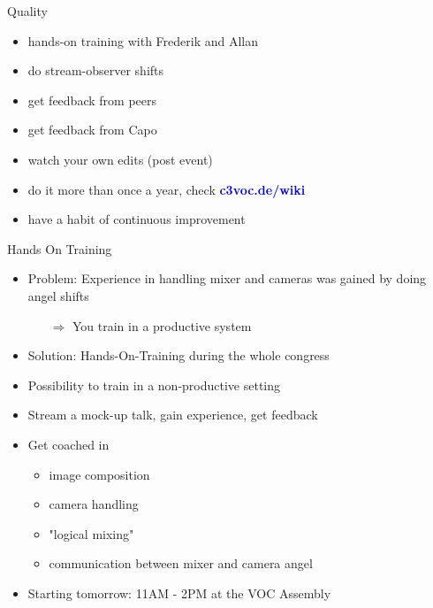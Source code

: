 \documentclass[hyperref={pdfpagelabels=false},aspectratio=169]{beamer}
\begin{document}
\begin{frame}{Quality}
\begin{itemize} [<+->]
\item hands-on training with Frederik and Allan %
\item do stream-observer shifts %
\item get feedback from peers %
\item get feedback from Capo %
\item watch your own edits (post event) %
\item do it more than once a year, check 
\textcolor{blue}{\textbf{c3voc.de/wiki }} %
\item have a habit of continuous improvement %
\end{itemize} 
\end{frame}

\begin{frame}{Hands On Training}
\begin{itemize}
\item Problem: Experience in handling mixer and cameras was gained by doing angel shifts 
\begin{itemize}
\item[$\Rightarrow$] You train in a productive system
\end{itemize}
\item Solution: Hands-On-Training during the whole congress
\item Possibility to train in a non-productive setting
\item Stream a mock-up talk, gain experience, get feedback
\item Get coached in
	\begin{itemize}
	\item image composition
	\item camera handling
	\item "logical mixing"
	\item communication between mixer and camera angel
	\end{itemize}
\item Starting tomorrow: 11AM - 2PM at the VOC Assembly
\end{itemize} 
\end{frame}
	
\end{document}
